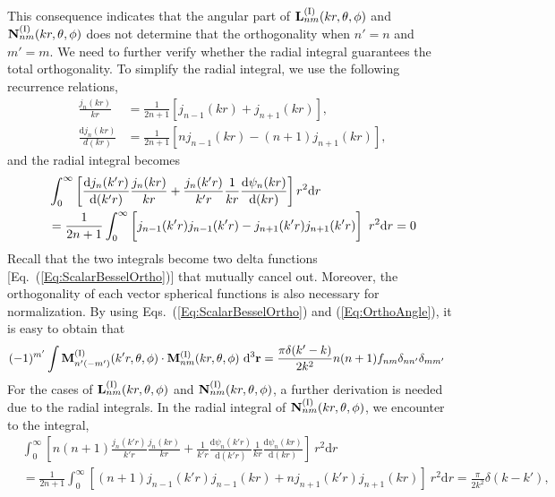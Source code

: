 \documentclass[journal=jacsat,manuscript=article,layout=traditional]{achemso}
\newcommand*\diff{\mathrm{d}}
\newcommand{\RomanI}{\scriptsize\textrm{I}}
\begin{document}
This consequence indicates that the angular part of  $\vb{L}_{nm}^{(\RomanI)}(kr,\theta,\phi)$ and $\vb{N}_{nm}^{(\RomanI)}(kr,\theta,\phi)$ does not determine that the orthogonality when $n'=n$ and $m'=m$.
We need to further verify whether the radial integral guarantees the total orthogonality.
To simplify the radial integral, we use the following recurrence relations,
\begin{align}
    \frac{j_n(kr)}{kr}&=
    \frac{1}{2n+1}\left[j_{n-1}(kr)+j_{n+1}(kr)\right],\\
    \frac{\diff j_n(kr)}{d(kr)}&=
    \frac{1}{2n+1}\left[nj_{n-1}(kr)-(n+1)j_{n+1}(kr)\right],
\end{align}
and the radial integral becomes
\begin{align}
    \nonumber
    &\int_0^\infty
    \left[
    \frac{\diff j_n(k'r)}{\diff{(k'r)}}
    \frac{j_n(kr)}{kr}+
    \frac{j_n(k'r)}{k'r}
    \frac{1}{kr}\frac{\diff\psi_n(kr)}{\diff{(kr)}}
    \right]r^2\diff{r}\\
    &=
    \frac{1}{2n+1}\int_0^\infty
    \left[\vphantom{\frac{1}{1}}
    j_{n-1}(k'r)j_{n-1}(k'r)-
    j_{n+1}(k'r)j_{n+1}(k'r)\right]~r^2\diff{r}=0
\end{align}
Recall that the two integrals become two delta functions [Eq.~(\ref{Eq:ScalarBesselOrtho})] that mutually cancel out.
Moreover, the orthogonality of each vector spherical functions is also necessary for normalization.
By using Eqs.~(\ref{Eq:ScalarBesselOrtho}) and (\ref{Eq:OrthoAngle}), it is easy to obtain that
\begin{align}
    &(-1)^{m'}\int\mathbf{M}_{n'(-m')}^{(\RomanI)}(k'r,\theta,\phi)\cdot\mathbf{M}_{nm}^{(\RomanI)}(kr,\theta,\phi)~\diff^3{\mathbf{r}}
    = \frac{\pi\delta(k'-k)}{2k^2}n(n+1)f_{nm}\delta_{nn'}\delta_{mm'}
    \label{Eq:orthoM}
\end{align}
For the cases of $\vb{L}_{nm}^{(\RomanI)}(kr,\theta,\phi)$ and $\vb{N}_{nm}^{(\RomanI)}(kr,\theta,\phi)$, a further derivation is needed due to the radial integrals.
In the radial integral of $\vb{N}_{nm}^{(\RomanI)}(kr,\theta,\phi)$, we encounter to the integral,
\begin{align}
    \nonumber
    &\int_0^\infty
    \left[n(n+1)
    \frac{j_{n}(k'r)}{k'r}\frac{j_{n}(kr)}{kr}+
    \frac{1}{k'r}\frac{\diff\psi_{n}(k'r)}{\diff{(k'r)}}
    \frac{1}{kr}\frac{\diff\psi_{n}(kr)}{\diff{(kr)}}
    \right]~r^2\diff{r}\\
    &=\frac{1}{2n+1}\int_0^\infty
    \left[(n+1)j_{n-1}(k'r)j_{n-1}(kr)+
    nj_{n+1}(k'r)j_{n+1}(kr)
    \right]~r^2\diff{r}=
    \frac{\pi}{2k^2}\delta(k-k'),
    \label{Eq:OrthoRadN}
\end{align}
\end{document}
